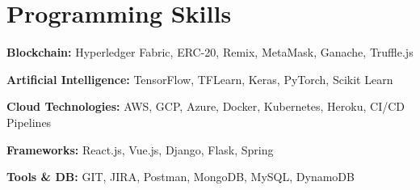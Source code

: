 \documentclass[letterpaper,11pt]{article}
\newcommand{\resumeItem}[2]{
  \item\small{
    \textbf{#1}{: #2 \vspace{-2pt}}
  }
}
\newcommand{\resumeSubItem}[2]{\resumeItem{#1}{#2}\vspace{-4pt}}
\newcommand{\resumeSubHeadingListStart}{\begin{itemize}[leftmargin=*]}
\newcommand{\resumeSubHeadingListEnd}{\end{itemize}}
\newcommand{\resumeItemListStart}{\begin{itemize}}
\newcommand{\resumeItemListEnd}{\end{itemize}\vspace{-5pt}}
\begin{document}
\section{Programming Skills}
    \begin{description}[noitemsep,topsep=0pt,leftmargin=*]
    \item[] 
    \item[] {\textbf{Blockchain: }Hyperledger Fabric, ERC-20, Remix, MetaMask, Ganache, Truffle.js}
    \item[] {\textbf{Artificial Intelligence: }TensorFlow, TFLearn, Keras, PyTorch, Scikit Learn}
    \item[] {\textbf{Cloud Technologies: }AWS, GCP, Azure, Docker, Kubernetes, Heroku, CI/CD Pipelines}
    \item[] {\textbf{Frameworks: }React.js, Vue.js, Django, Flask, Spring}
    \item[] {\textbf{Tools \& DB: }GIT, JIRA, Postman, MongoDB, MySQL, DynamoDB}
    \end{description}




\end{document}
